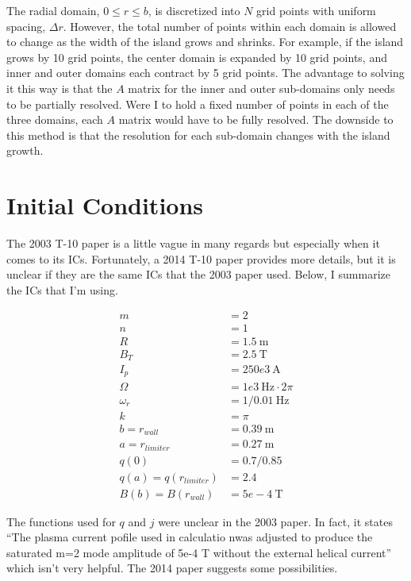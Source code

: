 \documentclass{article}
\begin{document}
The radial domain, $0 \leq r \leq b$, is discretized into $N$ grid points with uniform spacing, $\Delta r$.  However, the total number of points within each domain is allowed to change as the width of the island grows and shrinks.  For example, if the island grows by 10 grid points, the center domain is expanded by 10 grid points, and inner and outer domains each contract by 5 grid points.  The advantage to solving it this way is that the $A$ matrix for the inner and outer sub-domains only needs to be partially resolved.  Were I to hold a fixed number of points in each of the three domains, each $A$ matrix would have to be fully resolved.  The downside to this method is that the resolution for each sub-domain changes with the island growth. 


\section{Initial Conditions}

The 2003 T-10 paper is a little vague in many regards but especially when it comes to its ICs.  Fortunately, a 2014 T-10 paper provides more details, but it is unclear if they are the same ICs that the 2003 paper used.  Below, I summarize the ICs that I'm using. 

\begin{equation} \label{ICConstants}
\begin{split}
m &= 2 \\
n &= 1 \\
R &= 1.5 \ \text{m}\\
B_T &= 2.5 \ \text{T} \\
I_p &= 250e3 \ \text{A}\\
\Omega & =1e3 \ \text{Hz} \cdot 2 \pi \\
\omega_r & = 1/0.01 \ \text{Hz} \\
k &= \pi \\
b = r_{wall} & = 0.39 \ \text{m} \\
a = r_{limiter} & = 0.27 \ \text{m} \\
q(0) &= 0.7/0.85 \\
q(a) = q(r_{limiter}) &= 2.4 \\
B(b) = B(r_{wall}) & = 5e-4 \ \text{T}
\end{split} 
\end{equation} 

The functions used for $q$ and $j$ were unclear in the 2003 paper.  In fact, it states ``The plasma current pofile used in calculatio nwas adjusted to produce the saturated m=2 mode amplitude of 5e-4 T without the external helical current'' which isn't very helpful.  The 2014 paper suggests some possibilities.  
\end{document}
